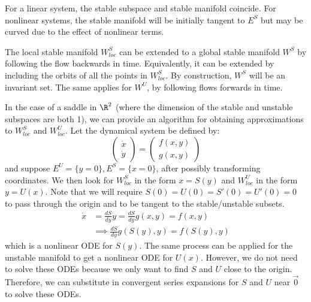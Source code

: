 \documentclass[../Main.tex]{subfiles}
\begin{document}
\begin{remarks}
    \item For a linear system, the stable subspace and stable manifold coincide. For nonlinear systems, the stable manifold will be initially tangent to $E^S$ but may be curved due to the effect of nonlinear terms.
    \item The local stable manifold $W^S_{loc}$ can be extended to a global stable manifold $W^S$ by following the flow backwards in time. Equivalently, it can be extended by including the orbits of all the points in $W^S_{loc}$. By construction, $W^S$ will be an invariant set. The same applies for $W^U$, by following flows forwards in time.
\end{remarks}

In the case of a saddle in $\R^2$ (where the dimension of the stable and unstable subspaces are both 1), we can provide an algorithm for obtaining approximations to $W^S_{loc}$ and $W^U_{loc}$. Let the dynamical system be defined by:
\begin{equation*}
    \begin{pmatrix}\dot{x} \\ \dot{y}\end{pmatrix} = \begin{pmatrix}f(x, y) \\ g(x, y)\end{pmatrix}
\end{equation*}
and suppose $E^U = \{y = 0\}, E^S = \{x = 0\}$, after possibly transforming coordinates. We then look for $W^S_{loc}$ in the form $x = S(y)$ and $W^U_{loc}$ in the form $y = U(x)$. Note that we will require $S(0) = U(0) = S'(0) = U'(0) = 0$ to pass through the origin and to be tangent to the stable/unstable subsets.
\begin{align*}
    \dot{x} &= \frac{dS}{dy} \dot{y} = \frac{dS}{dy} g(x, y) = f(x, y) \\
    &\implies \frac{dS}{dy} g(S(y), y) = f(S(y), y)
\end{align*}
which is a nonlinear ODE for $S(y)$. The same process can be applied for the unstable manifold to get a nonlinear ODE for $U(x)$. However, we do not need to solve these ODEs because we only want to find $S$ and $U$ close to the origin. Therefore, we can substitute in convergent series expansions for $S$ and $U$ near $\vec0$ to solve these ODEs.
\end{document}
